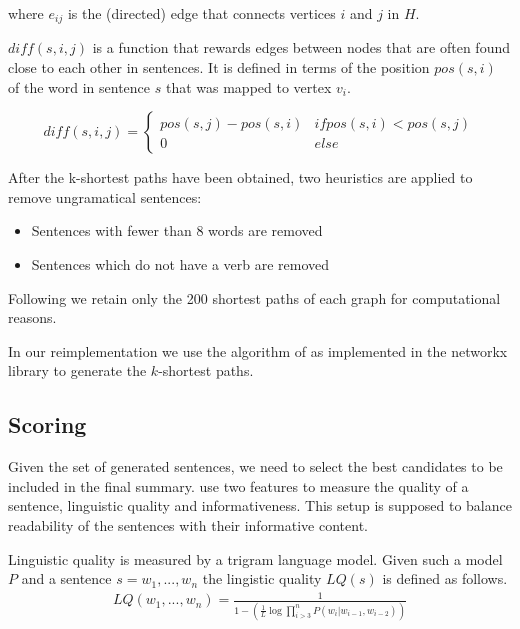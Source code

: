 \documentclass[a4paper,BCOR=10mm]{report}
\numberwithin{lemma}{chapter}
\numberwithin{definition}{chapter}
\begin{document}
where $e_{ij}$ is the (directed) edge that connects vertices $i$ and $j$ in $H$.

$\mathit{diff}(s, i, j)$ is a function that rewards edges between nodes that are often found close to each other in sentences. It is defined in terms of the position $\mathit{pos}(s, i)$ of the word in sentence $s$ that was mapped to vertex $v_i$.

\begin{equation}
\mathit{diff}(s, i, j) = \begin{cases}
\mathit{pos}(s, j) - \mathit{pos}(s, i) & \mathit{if }\mathit{pos}(s, i) < \mathit{pos}(s, j) \\
0 & \mathit{else}
\end{cases}
\end{equation}

After the k-shortest paths have been obtained, two heuristics are applied to remove ungramatical sentences:

\begin{itemize}
    \item {Sentences with fewer than $8$ words are removed}
    \item {Sentences which do not have a verb are removed}
\end{itemize}

Following \citet{banerjee} we retain only the 200 shortest paths of each graph for computational reasons.

In our reimplementation we use the algorithm of \citet{kshortestpath} as implemented in the networkx library \citep{networkx} to generate the $k$-shortest paths.

\subsection{Scoring}

Given the set of generated sentences, we need to select the best candidates to be included in the final summary. \citet{banerjee} use two features to measure the quality of a sentence, linguistic quality and informativeness. This setup is supposed to balance readability of the sentences with their informative content.

Linguistic quality is measured by a trigram language model. Given such a model $P$ and a sentence $s = w_1, ..., w_n$ the lingistic quality $LQ(s)$ is defined as follows.
\begin{align}
LQ(w_1, ..., w_n) = \frac{1}{1 - (\frac{1}{L} \log \prod_{i > 3}^{n} P(w_i | w_{i - 1}, w_{i - 2}))}
\end{align}
\end{document}
